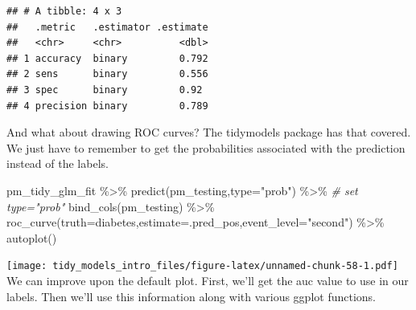 \documentclass[
]{article}
\newenvironment{Shaded}{\begin{snugshade}}{\end{snugshade}}
\newcommand{\AttributeTok}[1]{\textcolor[rgb]{0.77,0.63,0.00}{#1}}
\newcommand{\CommentTok}[1]{\textcolor[rgb]{0.56,0.35,0.01}{\textit{#1}}}
\newcommand{\FunctionTok}[1]{\textcolor[rgb]{0.00,0.00,0.00}{#1}}
\newcommand{\NormalTok}[1]{#1}
\newcommand{\SpecialCharTok}[1]{\textcolor[rgb]{0.00,0.00,0.00}{#1}}
\newcommand{\StringTok}[1]{\textcolor[rgb]{0.31,0.60,0.02}{#1}}
\begin{document}
\begin{verbatim}
## # A tibble: 4 x 3
##   .metric   .estimator .estimate
##   <chr>     <chr>          <dbl>
## 1 accuracy  binary         0.792
## 2 sens      binary         0.556
## 3 spec      binary         0.92 
## 4 precision binary         0.789
\end{verbatim}

And what about drawing ROC curves? The tidymodels package has that
covered. We just have to remember to get the probabilities associated
with the prediction instead of the labels.

\begin{Shaded}
\begin{Highlighting}[]
\NormalTok{pm\_tidy\_glm\_fit }\SpecialCharTok{\%\textgreater{}\%}
  \FunctionTok{predict}\NormalTok{(pm\_testing,}\AttributeTok{type=}\StringTok{"prob"}\NormalTok{) }\SpecialCharTok{\%\textgreater{}\%}      \CommentTok{\# set type="prob"}
  \FunctionTok{bind\_cols}\NormalTok{(pm\_testing) }\SpecialCharTok{\%\textgreater{}\%}
  \FunctionTok{roc\_curve}\NormalTok{(}\AttributeTok{truth=}\NormalTok{diabetes,}\AttributeTok{estimate=}\NormalTok{.pred\_pos,}\AttributeTok{event\_level=}\StringTok{"second"}\NormalTok{) }\SpecialCharTok{\%\textgreater{}\%}
  \FunctionTok{autoplot}\NormalTok{()}
\end{Highlighting}
\end{Shaded}

\texttt{[image: tidy\_models\_intro\_files/figure-latex/unnamed-chunk-58-1.pdf]}
We can improve upon the default plot. First, we'll get the auc value to
use in our labels. Then we'll use this information along with various
ggplot functions.
\end{document}
